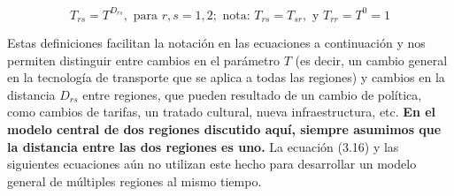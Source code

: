 \begin{equation}
    T_{rs}=T^{D_{rs}}, \mbox{ para } r,s=1,2; \mbox{ nota: } T_{rs}=T_{sr}, \mbox{ y } T_{rr}=T^0=1
\end{equation}

Estas definiciones facilitan la notación en las ecuaciones a continuación y nos permiten distinguir entre cambios en el parámetro $T$ (es decir, un cambio general en la tecnología de transporte que se aplica a todas las regiones) y cambios en la distancia $D_{rs}$ entre regiones, que pueden resultado de un cambio de política, como cambios de tarifas, un tratado cultural, nueva infraestructura, etc. \textbf{En el modelo central de dos regiones discutido aquí, siempre asumimos que la distancia entre las dos regiones es uno.} La ecuación (3.16) y las siguientes ecuaciones aún no utilizan este hecho para desarrollar un modelo general de múltiples regiones al mismo tiempo.

